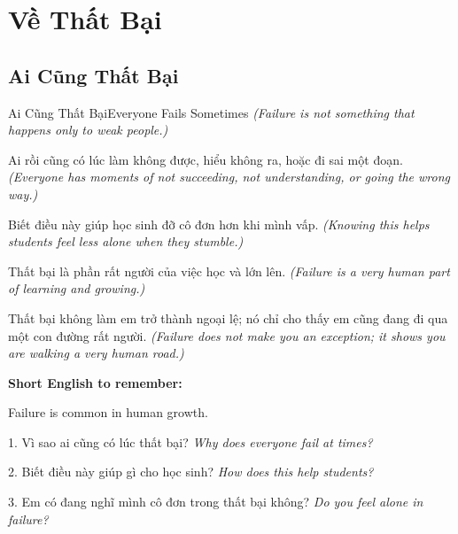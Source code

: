 \chapter{Về Thất Bại}

\section{Ai Cũng Thất Bại}
\begin{truyen}{Ai Cũng Thất Bại}{Everyone Fails Sometimes}
\textit{(Failure is not something that happens only to weak people.)}

Ai rồi cũng có lúc làm không được, hiểu không ra, hoặc đi sai một đoạn.
\textit{(Everyone has moments of not succeeding, not understanding, or going the wrong way.)}

Biết điều này giúp học sinh đỡ cô đơn hơn khi mình vấp.
\textit{(Knowing this helps students feel less alone when they stumble.)}

Thất bại là phần rất người của việc học và lớn lên.
\textit{(Failure is a very human part of learning and growing.)}
\end{truyen}

\begin{baihoc}
Thất bại không làm em trở thành ngoại lệ; nó chỉ cho thấy em cũng đang đi qua một con đường rất người.
\textit{(Failure does not make you an exception; it shows you are walking a very human road.)}
\end{baihoc}

\begin{ghinhoanh}
\textbf{Short English to remember:}

Failure is common in human growth.

\end{ghinhoanh}

\begin{tuhocnhanh}
1. Vì sao ai cũng có lúc thất bại? \textit{Why does everyone fail at times?}

2. Biết điều này giúp gì cho học sinh? \textit{How does this help students?}

3. Em có đang nghĩ mình cô đơn trong thất bại không? \textit{Do you feel alone in failure?}
\end{tuhocnhanh}
\ngancach

